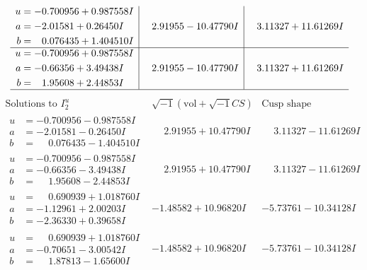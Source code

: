 \documentclass[1p]{elsarticle_modified}
\theoremstyle{definition}
\newcommand{\I}{\sqrt{-1}}
\begin{document}
$$\begin{array}{c|c|c}
\begin{aligned}
u &= -0.700956 + 0.987558 I \\
a &= -2.01581 + 0.26450 I \\
b &= \phantom{-}0.076435 + 1.404510 I\end{aligned}
 & \phantom{-}2.91955 - 10.47790 I & \phantom{-}3.11327 + 11.61269 I \\ \hline\begin{aligned}
u &= -0.700956 + 0.987558 I \\
a &= -0.66356 + 3.49438 I \\
b &= \phantom{-}1.95608 + 2.44853 I\end{aligned}
 & \phantom{-}2.91955 - 10.47790 I & \phantom{-}3.11327 + 11.61269 I\\
 \hline 
 \end{array}$$\newpage$$\begin{array}{c|c|c}  
\text{Solutions to }I^u_{2}& \I (\text{vol} + \sqrt{-1}CS) & \text{Cusp shape}\\
 \hline 
\begin{aligned}
u &= -0.700956 - 0.987558 I \\
a &= -2.01581 - 0.26450 I \\
b &= \phantom{-}0.076435 - 1.404510 I\end{aligned}
 & \phantom{-}2.91955 + 10.47790 I & \phantom{-}3.11327 - 11.61269 I \\ \hline\begin{aligned}
u &= -0.700956 - 0.987558 I \\
a &= -0.66356 - 3.49438 I \\
b &= \phantom{-}1.95608 - 2.44853 I\end{aligned}
 & \phantom{-}2.91955 + 10.47790 I & \phantom{-}3.11327 - 11.61269 I \\ \hline\begin{aligned}
u &= \phantom{-}0.690939 + 1.018760 I \\
a &= -1.12961 + 2.00203 I \\
b &= -2.36330 + 0.39658 I\end{aligned}
 & -1.48582 + 10.96820 I & -5.73761 - 10.34128 I \\ \hline\begin{aligned}
u &= \phantom{-}0.690939 + 1.018760 I \\
a &= -0.70651 - 3.00542 I \\
b &= \phantom{-}1.87813 - 1.65600 I\end{aligned}
 & -1.48582 + 10.96820 I & -5.73761 - 10.34128 I \\ \hline\begin{aligned}

\end{aligned}
\end{array}$$
\end{document}
